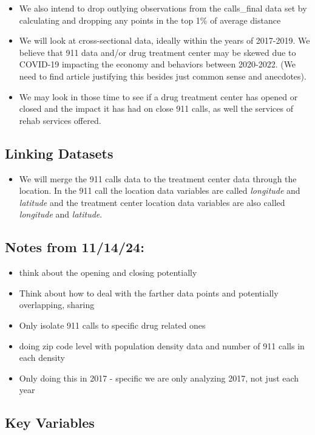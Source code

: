 \documentclass[12pt]{article}
\begin{document}
\begin{itemize}
\item We also intend to drop outlying observations from the calls\_final data set by calculating and dropping any points in the top 1\% of average distance
\item We will look at cross-sectional data, ideally within the years of 2017-2019. We believe that 911 data and/or drug treatment center may be skewed due to COVID-19 impacting the economy and behaviors between 2020-2022. (We need to find article justifying this besides just common sense and anecdotes). 
\item We may look in those time to see if a drug treatment center has opened or closed and the impact it has had on close 911 calls, as well the services of rehab services offered. 
\end{itemize}

\subsection{Linking Datasets}
\label{sec:discussion}

\begin{itemize}
    \item We will merge the 911 calls data to the treatment center data through the location. In the 911 call the location data variables are called \textit{longitude} and \textit{latitude} and the treatment center location data variables are also called \textit{longitude} and \textit{latitude}.
\end{itemize}

\subsection{Notes from 11/14/24:}
\begin{itemize}
    \item think about the opening and closing potentially
    \item Think about how to deal with the farther data points and potentially overlapping, sharing
    \item Only isolate 911 calls to specific drug related ones 
    \item doing zip code level with population density data and number of 911 calls in each density
    \item Only doing this in 2017 - specific we are only analyzing 2017, not just each year
\end{itemize}

\subsection{Key Variables}
\label{sec:result}
\end{document}
